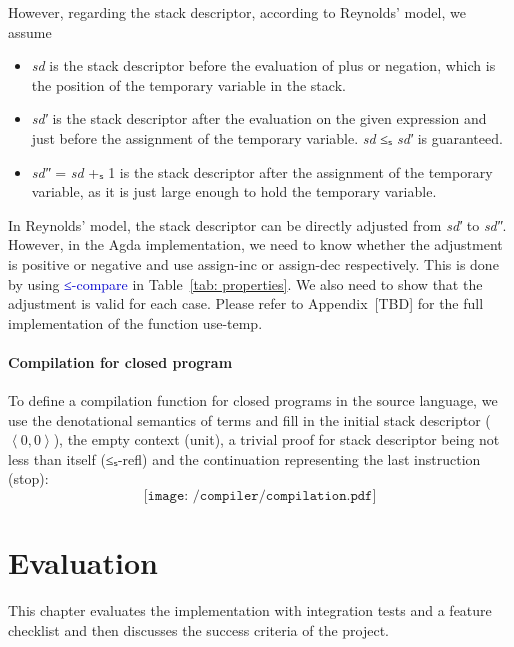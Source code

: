 \documentclass[12pt,a4paper]{report}
\makeatletter
\theoremstyle{definition}
\newcommand{\mb}[1]{\textcolor{mediumblue}{#1}}
\newcommand{\mbt}[1]{\mb{\textsf{#1}}}
\newcommand{\ang}[1]{\left\langle #1 \right\rangle}
\newcommand{\chapterminitoc}{%
  \begingroup
    \let\ps@plain\ps@empty %
    \let\ps@headings\ps@empty
    \minitoc
    \thispagestyle{empty} %
    \afterpage{\clearpage} %
  \endgroup
    \clearpage
  \addtocounter{page}{-1} %
}
\makeatother
\begin{document}
        However, regarding the stack descriptor, according to Reynolds' model, we assume
        \begin{itemize}
            \item \textit{sd} is the stack descriptor before the evaluation of plus or negation, which is the position of the temporary variable in the stack.
            \item \textit{sd′} is the stack descriptor after the evaluation on the given expression and just before the assignment of the temporary variable. \textit{sd} ≤ₛ \textit{sd′} is guaranteed.
            \item \textit{sd″} = \textit{sd} +ₛ 1 is the stack descriptor after the assignment of the temporary variable, as it is just large enough to hold the temporary variable.
        \end{itemize}
        In Reynolds' model, the stack descriptor can be directly adjusted from \textit{sd′} to \textit{sd″}. However, in the Agda implementation, we need to know whether the adjustment is positive or negative and use \textsf{assign-inc} or \textsf{assign-dec} respectively. This is done by using \mbt{≤-compare} in Table~\ref{tab: properties}. We also need to show that the adjustment is valid for each case. Please refer to Appendix~[TBD] for the full implementation of the function \textsf{use-temp}.
        

        \subsubsection{Compilation for closed program} \label{subsubsec: compilation}
        To define a compilation function for closed programs in the source language, we use the denotational semantics of terms and fill in the initial stack descriptor ($\ang{0, 0}$), the empty context (\textsf{unit}), a trivial proof for stack descriptor being not less than itself (\textsf{≤ₛ-refl}) and the continuation representing the last instruction (\textsf{stop}):
        \[\texttt{[image: /compiler/compilation.pdf]}\]




\chapter{Evaluation}
    \chapterminitoc
    This chapter evaluates the implementation with integration tests and a feature checklist and then discusses the success criteria of the project.
\end{document}
